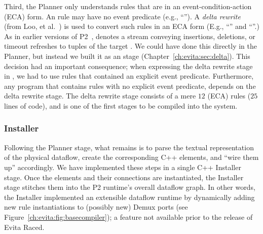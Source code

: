 
Third, the Planner only understands rules that are in an event-condition-action
(ECA) form.  An \OVERLOG rule may have no event predicate (e.g., ``'').  A {\em delta rewrite} (from Loo, et
al.~\cite{loo-sigmod06}) is used to convert such rules in an ECA form (E.g.,
``'' and ``''.) As in earlier versions of P2~\cite{loo-sigmod06},
 denotes a stream conveying insertions, deletions, or timeout
refreshes to tuples of the target .  We could have done this directly
in the Planner, but instead we built it as an \OVERLOG stage
(Chapter~\ref{ch:evita:sec:delta}).  This decision had an important
consequence; when expressing the delta rewrite stage in \OVERLOG, we had to use
rules that contained an explicit event predicate.  Furthermore, any \OVERLOG
program that contains rules with no explicit event predicate, depends on the
delta rewrite stage.  The delta rewrite stage consists of a mere $12$ \OVERLOG
(ECA) rules ($25$ lines of code), and is one of the first \OVERLOG stages to be
compiled into the system.
 

\subsubsection{Installer}
\label{ch:evita:sec:installer}

Following the Planner stage, what remains is to parse the textual
representation of the physical dataflow, create the corresponding C++ elements,
and ``wire them up'' accordingly.  We have implemented these steps in a single
C++ Installer stage.  Once the elements and their connections are instantiated,
the Installer stage stitches them into the P2 runtime's overall dataflow graph.
In other words, the Installer implemented an extensible dataflow runtime by
dynamically adding new rule instantiations to (possibly new) Demux ports (see
Figure~\ref{ch:evita:fig:basecompiler}); a feature not available prior to the
release of Evita Raced.

